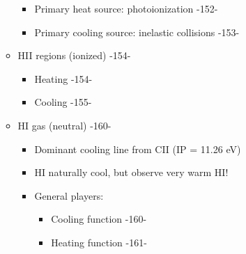 \documentclass{article}
\begin{document}
\begin{enumerate}[I.]
\begin{itemize}
      \begin{itemize}
        \item Primary heat source: photoionization -152-
        \item Primary cooling source: inelastic collisions -153-
      \end{itemize}
      \item HII regions (ionized) -154-
      \begin{itemize}
        \item Heating -154-
        \item Cooling -155-
      \end{itemize}
      \item HI gas (neutral) -160-
      \begin{itemize}
        \item Dominant cooling line from CII (IP = 11.26 eV)
        \item HI naturally cool, but observe very warm HI!
        \item General players:
        \begin{itemize}
          \item Cooling function -160-
          \item Heating function -161-
        \end{itemize}
      \end{itemize}
    \end{itemize}
\end{enumerate}
\end{document}
